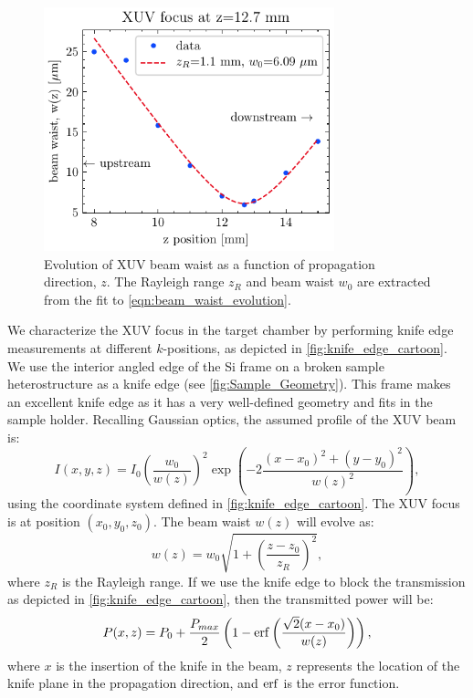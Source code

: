 \begin{figure}
	\centering
	\includegraphics[width=0.75\textwidth]{figures/chap3/XUV_waist_vs_k.pdf}
	\caption{Evolution of XUV beam waist as a function of propagation direction, $z$. The Rayleigh range $z_R$ and beam waist $w_0$ are extracted from the fit to \cref{eqn:beam_waist_evolution}.}
	\label{fig:XUV_waist_vs_k}
\end{figure}

We characterize the XUV focus in the target chamber by performing knife edge measurements at different $k$-positions, as depicted in \cref{fig:knife_edge_cartoon}. We use the interior angled edge of the Si frame on a broken sample heterostructure as a knife edge (see \cref{fig:Sample_Geometry}). This frame makes an excellent knife edge as it has a very well-defined geometry and fits in the sample holder. Recalling Gaussian optics, the assumed profile of the XUV beam is:
\begin{equation}
I(x,y,z) = I_0 \left( \frac{w_0}{w(z)} \right)^2 \exp \left( -2 \frac{ (x-x_0)^2 + (y-y_0)^2 }{w(z)^2} \right),
\end{equation}
using the coordinate system defined in \cref{fig:knife_edge_cartoon}. The XUV focus is at position $(x_0,y_0,z_0)$. The beam waist $w(z)$ will evolve as:
\begin{equation}
w(z) = w_0 \sqrt{ 1 + \left( \frac{z-z_0}{z_R} \right)^2 },
\label{eqn:beam_waist_evolution}
\end{equation}
where $z_R$ is the Rayleigh range. If we use the knife edge to block the transmission as depicted in \cref{fig:knife_edge_cartoon}, then the transmitted power will be:
\begin{equation}
P(x, z) = P_0 + \frac{P_{max}}{2} \left( 1 - \erf \left( \frac{\sqrt{2}(x-x_0)}{w(z)} \right) \right),
\label{eqn:knife_edge}
\end{equation}
where $x$ is the insertion of the knife in the beam, $z$ represents the location of the knife plane in the propagation direction, and $\erf$ is the error function.

